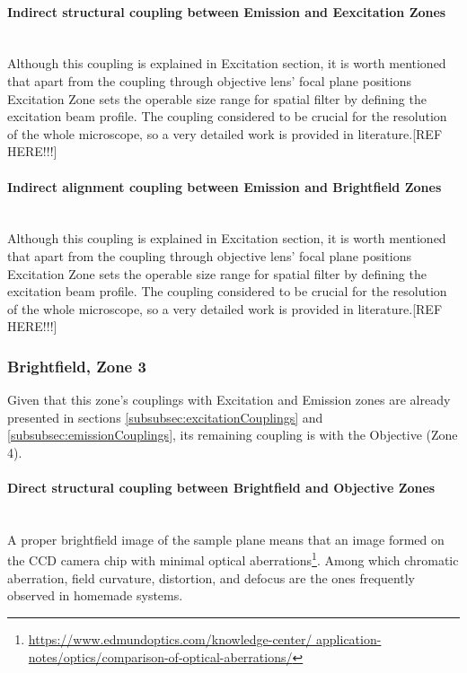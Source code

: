 \paragraph{Indirect structural coupling between Emission and Eexcitation Zones}\mbox{}\\
Although this coupling is explained in Excitation section, it is worth mentioned that apart
from the coupling through objective lens' focal plane positions Excitation Zone sets the 
operable size range for spatial filter by defining the excitation beam profile. The coupling
considered to be crucial for the resolution of the whole microscope, so a very detailed work
is provided in literature.[REF HERE!!!]

\paragraph{Indirect alignment coupling between Emission and Brightfield Zones}\mbox{}\\
Although this coupling is explained in Excitation section, it is worth mentioned that apart
from the coupling through objective lens' focal plane positions Excitation Zone sets the 
operable size range for spatial filter by defining the excitation beam profile. The coupling
considered to be crucial for the resolution of the whole microscope, so a very detailed work
is provided in literature.[REF HERE!!!]

\subsubsection{Brightfield, Zone 3}\label{subsubsec:brightfieldCouplings}
Given that this zone's couplings with Excitation and Emission zones are already presented in
sections \ref{subsubsec:excitationCouplings} and \ref{subsubsec:emissionCouplings}, its
remaining coupling is with the Objective (Zone 4). 

\paragraph{Direct structural coupling between Brightfield and Objective Zones}\mbox{}\\
A proper brightfield image of the sample plane means that an image formed on the CCD camera
chip with minimal optical aberrations\footnote{\url{https://www.edmundoptics.com/knowledge-center/
		application-notes/optics/comparison-of-optical-aberrations/}}. Among which chromatic aberration, 
field curvature, distortion, and defocus are the ones frequently observed in homemade systems.

